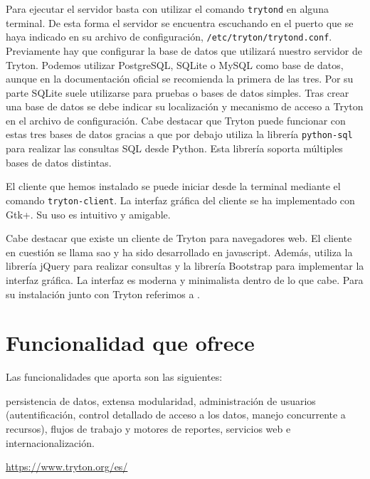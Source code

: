 \documentclass{article}
\begin{document}
Para ejecutar el servidor basta con utilizar el comando \texttt{trytond} en alguna terminal. De esta forma el servidor se encuentra escuchando en el puerto que se haya indicado en su archivo de configuración, \texttt{/etc/tryton/trytond.conf}. Previamente hay que configurar la base de datos que utilizará nuestro servidor de Tryton. Podemos utilizar PostgreSQL, SQLite o MySQL como base de datos, aunque en la documentación oficial se recomienda la primera de las tres. Por su parte SQLite suele utilizarse para pruebas o bases de datos simples. Tras crear una base de datos se debe indicar su localización y mecanismo de acceso a Tryton en el archivo de configuración. Cabe destacar que Tryton puede funcionar con estas tres bases de datos gracias a que por debajo utiliza la librería \texttt{python-sql} para realizar las consultas SQL desde Python. Esta librería soporta múltiples bases de datos distintas.

El cliente que hemos instalado se puede iniciar desde la terminal mediante el comando \texttt{tryton-client}. La interfaz gráfica del cliente se ha implementado con Gtk+. Su uso es intuitivo y amigable.

Cabe destacar que existe un cliente de Tryton para navegadores web. El cliente en cuestión se llama sao y ha sido desarrollado en javascript. Además, utiliza la librería jQuery para realizar consultas y la librería Bootstrap para implementar la interfaz gráfica. La interfaz es moderna y minimalista dentro de lo que cabe. Para su instalación junto con Tryton referimos a \cite{sao}.



\section{Funcionalidad que ofrece}

Las funcionalidades que aporta son las siguientes:

persistencia de datos, extensa modularidad, administración de usuarios (autentificación, control detallado de acceso a los datos, manejo concurrente a recursos), flujos de trabajo y motores de reportes, servicios web e internacionalización.

\url{https://www.tryton.org/es/}

\end{document}
